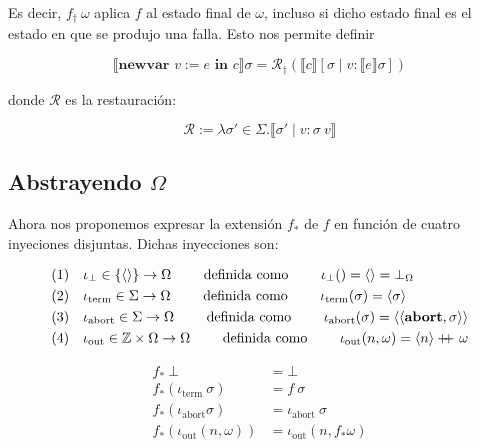 \documentclass[article, 12pt]{article}
\newcommand\doubleplus{+\kern-1.3ex+\kern0.8ex}
\begin{document}
Es decir, $f_\dagger ~ \omega$ aplica $f$ al estado final de $\omega$, incluso
si dicho estado final es el estado en que se produjo una falla. Esto nos permite
definir 

\begin{equation*}
  \llbracket \textbf{newvar } v := e \textbf{ in } c\rrbracket\sigma = \mathcal{R}_\dagger \left( \llbracket c \rrbracket[\sigma \mid v :
  \llbracket e \rrbracket \sigma] \right) 
\end{equation*}

donde $\mathcal{R}$ es la restauración:

\begin{equation*}
  \mathcal{R} := \lambda \sigma' \in \Sigma . \llbracket \sigma' \mid v : \sigma
  ~ v\rrbracket
\end{equation*}

\subsection{Abstrayendo $\Omega$}

Ahora nos proponemos expresar la extensión $f_*$ de $f$ en función de cuatro
inyeciones disjuntas. Dichas inyecciones son:

\begin{align*}
  &(1) ~ ~ ~ \iota_\bot \in \left\{ \left< \right> \right\} \to \Omega \qquad \text{ definida como
  } \qquad \iota_\bot () = \left< \right> = \bot_\Omega\\
  &(2) ~ ~  ~\iota_{\text{term}} \in \Sigma \to \Omega \qquad \text{ definida como
  } \qquad \iota_{\text{term}}(\sigma) = \left<\sigma \right>\\
  &(3) ~ ~ ~ \iota_{\text{abort}} \in \Sigma \to \Omega \qquad \text{ definida como
  } \qquad \iota_{\text{abort}} (\sigma) = \left<\left<\textbf{abort}, \sigma \right> \right>\\
  &(4)~ ~ ~ \iota_{\text{out}} \in \mathbb{Z} \times \Omega \to \Omega \qquad \text{ definida como
  } \qquad \iota_{\text{out}}(n, \omega) = \left<n \right> \doubleplus \omega
\end{align*}

\begin{align*}
  f_* ~ \bot &= \bot  \\ 
  f_*(\iota_\text{term} ~ \sigma) &= f ~ \sigma \\ 
  f_*(\iota_{\text{abort}} \sigma) &= \iota_{\text{abort}} ~ \sigma \\ 
  f_*(\iota_{\text{out}}(n, \omega)) &= \iota_{\text{out}}(n, f_* \omega)
\end{align*}
\end{document}
